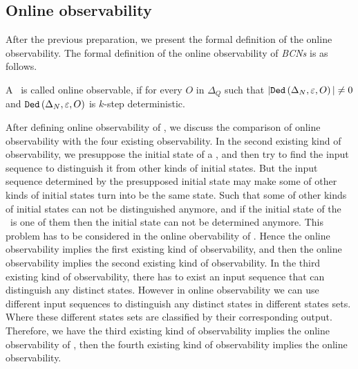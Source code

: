 \subsection{Online observability}
After the previous preparation, we present the formal definition of the online observability. The formal definition of the online observability of {\em BCNs} is as follows.
\begin{definition}
 A \BCN\ is called online observable,
if for every  $O$ in $\Delta_Q$ such that $|{\tt Ded}\left(\Delta_N,\varepsilon, O\right)|\neq 0$ and ${\tt Ded}\left(\Delta_N,\varepsilon,O\right)$ is $k$-step deterministic.
\end{definition}


After defining online observability of \BCNs, we discuss the comparison of online observability with the four existing observability. In the second existing kind of observability, we presuppose the initial state of a \BCN, and then try to find the input sequence to distinguish it from other kinds of initial states. But the input sequence determined by the presupposed initial state may make some of other kinds of initial states turn into be the same state. Such that some of other kinds of initial states can not be distinguished anymore, and if the initial state of the \BCN\ is one of them then the initial state can not be determined anymore. This problem has to be considered in the online obervability of \BCNs. Hence the online observability implies the first existing kind of observability, and then the online observability implies the second existing kind of observability. In the third existing kind of observability, there has to exist an input sequence that can distinguish any distinct states. However in online observability we can use different input sequences to distinguish any distinct states in different states sets. Where these different states sets are classified by their corresponding output. Therefore, we have the third existing kind of observability implies the online observability of \BCNs, then the fourth existing kind of observability implies the online observability.

